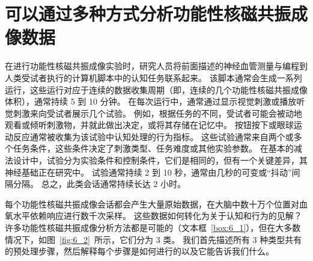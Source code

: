 \section{可以通过多种方式分析功能性核磁共振成像数据}

在进行功能性核磁共振成像实验时，研究人员将前面描述的神经血管测量与编程到人类受试者执行的计算机脚本中的认知任务联系起来。
该脚本通常会生成一系列运行，这些运行对应于连续的数据收集周期（即，连续的几个功能性核磁共振成像体积），通常持续 5 到 10 分钟。 
在每次运行中，通常通过显示视觉刺激或播放听觉刺激来向受试者展示几个试验。 
例如，根据任务的不同，受试者可能会被动地观看或倾听刺激物，并就此做出决定，或将其存储在记忆中。 
按钮按下或眼球运动反应通常被收集为该试验中认知处理的行为指标。 
这些试验通常来自两个或多个任务条件，这些条件决定了刺激类型、任务难度或其他实验参数。 
在基本的减法设计中，试验分为实验条件和控制条件，它们是相同的，但有一个关键差异，其神经基础正在研究中。 
试验通常持续 2 到 10 秒，通常由几秒的可变或“抖动”间隔分隔。 
总之，此类会话通常持续长达 2 小时。


每个功能性核磁共振成像会话都会产生大量原始数据，在大脑中数十万个位置对血氧水平依赖响应进行数千次采样。 
这些数据如何转化为关于认知和行为的见解？ 
许多功能性核磁共振成像分析方法都是可能的（文本框~\ref{box:6_1}），但在大多数情况下，如图~\ref{fig:6_2}~所示，它们分为 3 类。
我们首先描述所有 3 种类型共有的预处理步骤，然后解释每个步骤是如何进行的以及它能告诉我们什么。


